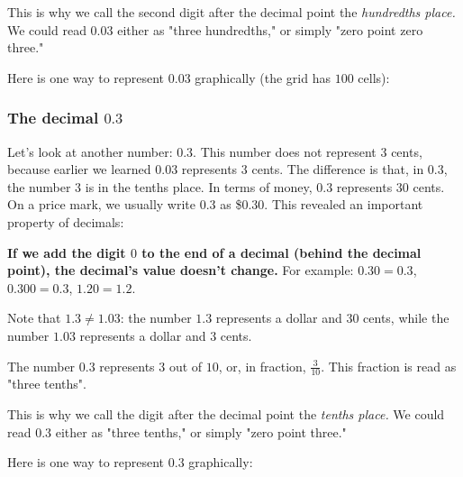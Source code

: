 This is why we call the second digit after the decimal point the \textit{hundredths place.} We could read $0.03$ either as "three hundredths," or simply "zero point zero three."

Here is one way to represent $0.03$ graphically (the grid has $100$ cells):

\begin{center}
\end{center}

\subsubsection{The decimal $0.3$}
Let's look at another number: $0.3$. This number does not represent $3$ cents, because earlier we learned $0.03$ represents $3$ cents. The difference is that, in $0.3$, the number $3$ is in the tenths place. In terms of money, $0.3$ represents $30$ cents. On a price mark, we usually write $0.3$ as \$$0.30$. This revealed an important property of decimals:

\textbf{If we add the digit $0$ to the end of a decimal (behind the decimal point), the decimal's value doesn't change.} For example: $0.30=0.3$, $0.300=0.3$, $1.20=1.2$.

Note that $1.3\neq1.03$: the number $1.3$ represents a dollar and $30$ cents, while the number $1.03$ represents a dollar and $3$ cents.

The number $0.3$ represents $3$ out of $10$, or, in fraction, $\frac{3}{10}$. This fraction is read as "three tenths".

This is why we call the digit after the decimal point the \textit{tenths place.} We could read $0.3$ either as "three tenths," or simply "zero point three."

Here is one way to represent $0.3$ graphically:

\begin{center}
\end{center}

